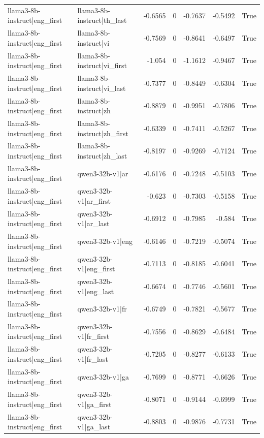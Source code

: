 \begin{table}
\begin{tabular}{l l r r r r l}
llama3-8b-instruct|eng_first & llama3-8b-instruct|th_last & -0.6565 & 0 & -0.7637 & -0.5492 & True \\
llama3-8b-instruct|eng_first & llama3-8b-instruct|vi & -0.7569 & 0 & -0.8641 & -0.6497 & True \\
llama3-8b-instruct|eng_first & llama3-8b-instruct|vi_first & -1.054 & 0 & -1.1612 & -0.9467 & True \\
llama3-8b-instruct|eng_first & llama3-8b-instruct|vi_last & -0.7377 & 0 & -0.8449 & -0.6304 & True \\
llama3-8b-instruct|eng_first & llama3-8b-instruct|zh & -0.8879 & 0 & -0.9951 & -0.7806 & True \\
llama3-8b-instruct|eng_first & llama3-8b-instruct|zh_first & -0.6339 & 0 & -0.7411 & -0.5267 & True \\
llama3-8b-instruct|eng_first & llama3-8b-instruct|zh_last & -0.8197 & 0 & -0.9269 & -0.7124 & True \\
llama3-8b-instruct|eng_first & qwen3-32b-v1|ar & -0.6176 & 0 & -0.7248 & -0.5103 & True \\
llama3-8b-instruct|eng_first & qwen3-32b-v1|ar_first & -0.623 & 0 & -0.7303 & -0.5158 & True \\
llama3-8b-instruct|eng_first & qwen3-32b-v1|ar_last & -0.6912 & 0 & -0.7985 & -0.584 & True \\
llama3-8b-instruct|eng_first & qwen3-32b-v1|eng & -0.6146 & 0 & -0.7219 & -0.5074 & True \\
llama3-8b-instruct|eng_first & qwen3-32b-v1|eng_first & -0.7113 & 0 & -0.8185 & -0.6041 & True \\
llama3-8b-instruct|eng_first & qwen3-32b-v1|eng_last & -0.6674 & 0 & -0.7746 & -0.5601 & True \\
llama3-8b-instruct|eng_first & qwen3-32b-v1|fr & -0.6749 & 0 & -0.7821 & -0.5677 & True \\
llama3-8b-instruct|eng_first & qwen3-32b-v1|fr_first & -0.7556 & 0 & -0.8629 & -0.6484 & True \\
llama3-8b-instruct|eng_first & qwen3-32b-v1|fr_last & -0.7205 & 0 & -0.8277 & -0.6133 & True \\
llama3-8b-instruct|eng_first & qwen3-32b-v1|ga & -0.7699 & 0 & -0.8771 & -0.6626 & True \\
llama3-8b-instruct|eng_first & qwen3-32b-v1|ga_first & -0.8071 & 0 & -0.9144 & -0.6999 & True \\
llama3-8b-instruct|eng_first & qwen3-32b-v1|ga_last & -0.8803 & 0 & -0.9876 & -0.7731 & True \\

\end{tabular}
\end{table}
